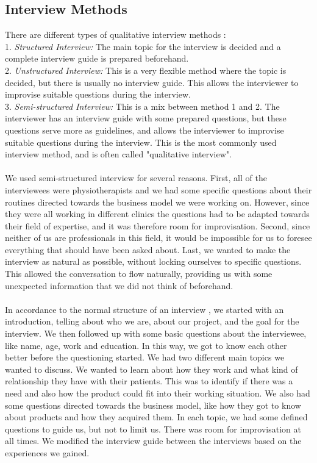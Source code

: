 \subsection{Interview Methods}
There are different types of qualitative interview methods \cite{interview} \cite{interview2}: \\ 
1. \emph{Structured Interview:} The main topic for the interview is decided and a complete interview guide is prepared beforehand. \\ 
2. \emph{Unstructured Interview:} This is a very flexible method where the topic is decided, but there is usually no interview guide. This allows the interviewer to improvise suitable questions during the interview. \\ 
3. \emph{Semi-structured Interview:} This is a mix between method 1 and 2. The interviewer has an interview guide with some prepared questions, but these questions serve more as guidelines, and allows the interviewer to improvise suitable questions during the interview. This is the most commonly used interview method, and is often called "qualitative interview".  \\ \\
We used semi-structured interview for several reasons. First, all of the interviewees were physiotherapists and we had some specific questions about their routines directed towards the business model we were working on. However, since they were all working in different clinics the questions had to be adapted towards their field of expertise, and it was therefore room for improvisation. Second, since neither of us are professionals in this field, it would be impossible for us to foresee everything that should have been asked about. Last, we wanted to make the interview as natural as possible, without locking ourselves to specific questions. This allowed the conversation to flow naturally, providing us with some unexpected information that we did not think of beforehand. \\ \\
In accordance to the normal structure of an interview \cite{interview2}, we started with an introduction, telling about who we are, about our project, and the goal for the interview. We then followed up with some basic questions about the interviewee, like name, age, work and education. In this way, we got to know each other better before the questioning started. We had two different main topics we wanted to discuss. We wanted to learn about how they work and what kind of relationship they have with their patients. This was to identify if there was a need and also how the product could fit into their working situation. We also had some questions directed towards the business model, like how they got to know about products and how they acquired them. In each topic, we had some defined questions to guide us, but not to limit us. There was room for improvisation at all times. We modified the interview guide between the interviews based on the experiences we gained.

